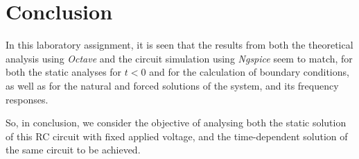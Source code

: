 \section{Conclusion}
\label{sec:conclusion}



In this laboratory assignment, it is seen that the results from both the theoretical analysis using \textit{Octave} and the circuit simulation using \textit{Ngspice} seem to match, for both the static analyses for $t<0$ and for the calculation of boundary conditions, as well as for the natural and forced solutions of the system, and its frequency responses.
\par
So, in conclusion, we consider the objective of analysing both the static solution of this RC circuit with fixed applied voltage, and the time-dependent solution of the same circuit to be achieved.
